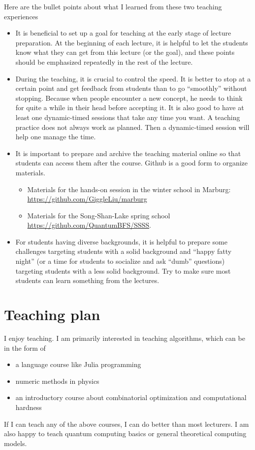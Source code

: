 \documentclass[a4paper]{article}
\newcommand{\<}{\langle}
\renewcommand{\>}{\rangle}
\begin{document}
Here are the bullet points about what I learned from these two teaching experiences
\begin{itemize}
    \item It is beneficial to set up a goal for teaching at the early stage of lecture preparation. At the beginning of each lecture, it is helpful to let the students know what they can get from this lecture (or the goal), and these points should be emphasized repeatedly in the rest of the lecture.
    \item During the teaching, it is crucial to control the speed.
It is better to stop at a certain point and get feedback from students than to go ``smoothly'' without stopping.
Because when people encounter a new concept, he needs to think for quite a while in their head before accepting it. It is also good to have at least one dynamic-timed sessions that take any time you want. A teaching practice does not always work as planned. Then a dynamic-timed session will help one manage the time.
    \item It is important to prepare and archive the teaching material online so that students can access them after the course. Github is a good form to organize materials.
    \begin{itemize}
        \item Materials for the hands-on session in the winter school in Marburg: \href{https://github.com/GiggleLiu/marburg}{https://github.com/GiggleLiu/marburg}
        \item Materials for the Song-Shan-Lake spring school \href{https://github.com/QuantumBFS/SSSS}{https://github.com/QuantumBFS/SSSS}.
    \end{itemize}
    \item For students having diverse backgrounds, it is helpful to prepare some challenges targeting students with a solid background and ``happy fatty night'' (or a time for students to socialize and ask ``dumb'' questions) targeting students with a less solid background. Try to make sure most students can learn something from the lectures.
\end{itemize}

\section{Teaching plan}
I enjoy teaching. I am primarily interested in teaching algorithms, which can be in the form of 
\begin{itemize}
    \item a language course like Julia programming
    \item numeric methods in physics
    \item an introductory course about combinatorial optimization and computational hardness
\end{itemize}
If I can teach any of the above courses, I can do better than most lecturers. I am also happy to teach quantum computing basics or general theoretical computing models.
\end{document}
